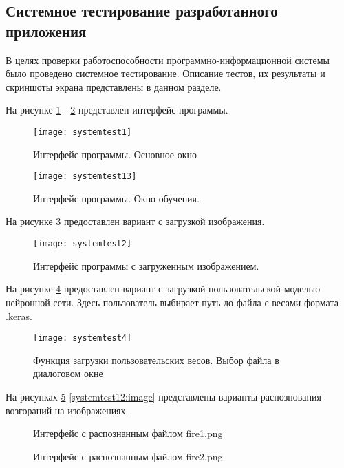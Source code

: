\subsection{Системное тестирование разработанного приложения}
В целях проверки работоспособности программно-информационной системы было проведено системное тестирование. Описание тестов, их результаты и скриншоты экрана представлены в данном разделе.

На рисунке \ref{systemtest1:image} -  \ref{systemtest13:image} представлен интерфейс программы.
\begin{figure}[H]
\centering
\texttt{[image: systemtest1]}
\caption{Интерфейс программы. Основное окно}
\label{systemtest1:image}
\end{figure}

\begin{figure}[H]
\centering
\texttt{[image: systemtest13]}
\caption{Интерфейс программы. Окно обучения.}
\label{systemtest13:image}
\end{figure}

На рисунке \ref{systemtest2:image} предоставлен вариант с загрузкой изображения.

\begin{figure}[H]
\centering
\texttt{[image: systemtest2]}
\caption{Интерфейс программы с загруженным изображением.}
\label{systemtest2:image}
\end{figure}

На рисунке \ref{systemtest4:image} предоставлен вариант с загрузкой пользовательской моделью нейронной сети. Здесь пользователь выбирает путь до файла с весами формата .keras.

\begin{figure}[H]
\centering
\texttt{[image: systemtest4]}
\caption{Функция загрузки пользовательских весов. Выбор файла в диалоговом окне}
\label{systemtest4:image}
\end{figure}

На рисунках \ref{systemtest3:image}-\ref{systemtest12:image} представлены варианты распознования возгораний на изображениях.

\begin{figure}[H]
\caption{Интерфейс с распознанным файлом fire1.png}
\label{systemtest3:image}
\end{figure}

\begin{figure}[H]
\caption{Интерфейс с распознанным файлом fire2.png}
\label{systemtest5:image}
\end{figure}

